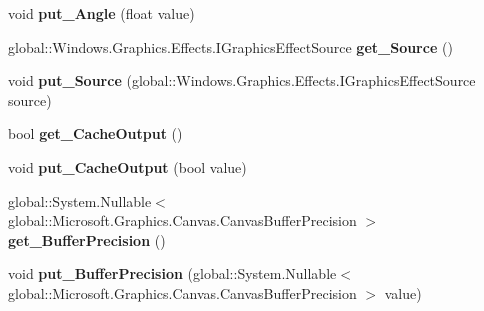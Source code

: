 \begin{DoxyCompactItemize}
void {\bfseries put\+\_\+\+Angle} (float value)
\item 
\mbox{\label{class_microsoft_1_1_graphics_1_1_canvas_1_1_effects_1_1_emboss_effect_a36340e7d6e5ac47dd89f4f7d37c07345}} 
global\+::\+Windows.\+Graphics.\+Effects.\+I\+Graphics\+Effect\+Source {\bfseries get\+\_\+\+Source} ()
\item 
\mbox{\label{class_microsoft_1_1_graphics_1_1_canvas_1_1_effects_1_1_emboss_effect_a314ec78bf6cdaad6673cf374c267cdf0}} 
void {\bfseries put\+\_\+\+Source} (global\+::\+Windows.\+Graphics.\+Effects.\+I\+Graphics\+Effect\+Source source)
\item 
\mbox{\label{class_microsoft_1_1_graphics_1_1_canvas_1_1_effects_1_1_emboss_effect_a5d487e3805c8a718aa6ec80761806b9e}} 
bool {\bfseries get\+\_\+\+Cache\+Output} ()
\item 
\mbox{\label{class_microsoft_1_1_graphics_1_1_canvas_1_1_effects_1_1_emboss_effect_a95e103f8178fdc5b88c0773380e172bb}} 
void {\bfseries put\+\_\+\+Cache\+Output} (bool value)
\item 
\mbox{\label{class_microsoft_1_1_graphics_1_1_canvas_1_1_effects_1_1_emboss_effect_ab93ee8ef4edb03a851c1e92e305e56af}} 
global\+::\+System.\+Nullable$<$ global\+::\+Microsoft.\+Graphics.\+Canvas.\+Canvas\+Buffer\+Precision $>$ {\bfseries get\+\_\+\+Buffer\+Precision} ()
\item 
\mbox{\label{class_microsoft_1_1_graphics_1_1_canvas_1_1_effects_1_1_emboss_effect_a82a3320c61a308b9c1336fd1d381f86c}} 
void {\bfseries put\+\_\+\+Buffer\+Precision} (global\+::\+System.\+Nullable$<$ global\+::\+Microsoft.\+Graphics.\+Canvas.\+Canvas\+Buffer\+Precision $>$ value)
\item 
\mbox{\label{class_microsoft_1_1_graphics_1_1_canvas_1_1_effects_1_1_emboss_effect_a07b6160e699d5f728fa8b88436e75cd8}} 

\end{DoxyCompactItemize}
